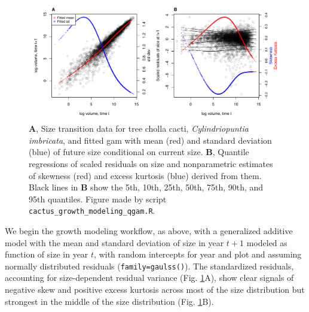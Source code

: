 \documentclass[12pt]{article}
\begin{document}
\begin{figure}[tbp]
	\centering
	\includegraphics[width=1.0\textwidth]{figures/cactus_qgam_diagnostics.pdf}
	\caption{\textbf{A}, Size transition data for tree cholla cacti, \emph{Cylindriopuntia imbricata}, and fitted gam with mean (red) and standard deviation (blue) of future size conditional on current size.  \textbf{B}, Quantile regressions of scaled residuals on size and nonparametric estimates of skewness (red) and excess kurtosis (blue) derived from them. Black lines in \textbf{B} show the 5th, 10th, 25th, 50th, 75th, 90th, and 95th quantiles. Figure made by script \texttt{cactus\_growth\_modeling\_qgam.R}.}
	\label{fig:cactus_diagnostics}
\end{figure} 


We begin the growth modeling workflow, as above, with a generalized additive model with the mean and standard deviation of size in year $t+1$ modeled as function of size in year $t$, with random intercepts for year and plot and assuming normally distributed residuals (\texttt{family=gaulss()}). 
The standardized residuals, accounting for size-dependent residual variance (Fig. \ref{fig:cactus_diagnostics}A), show clear signals of negative skew and positive excess kurtosis across most of the size distribution but strongest in the middle of the size distribution (Fig. \ref{fig:cactus_diagnostics}B). 
\end{document}
